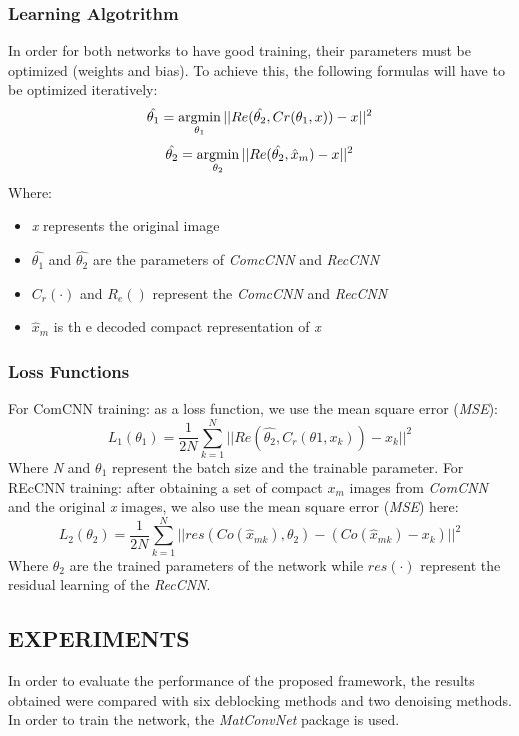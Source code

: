 \subsubsection{Learning Algotrithm}
In order for both networks to have good training, their parameters must be 
optimized (weights and bias). To achieve this, the following formulas will 
have to be optimized iteratively:
\begin{equation}
    \hat{\theta_1} = \operatorname*{argmin}\limits_{\theta_1}||Re(\hat{\theta_2},Cr(\theta_1,x))-x||^2
\end{equation}
\begin{equation}
    \hat{\theta_2} = \operatorname*{argmin}\limits_{\theta_2}||Re(\hat{\theta_2},\hat{x}_m)-x||^2
\end{equation}
Where:
\begin{itemize}
    \item \emph{x} represents the original image
    \item $ \hat{\theta_1} $ and $ \hat{\theta_2} $ are the parameters of \emph{ComcCNN} and \emph{RecCNN}
    \item $ C_r(\cdot) $ and $ R_e() $ represent the \emph{ComcCNN} and \emph{RecCNN}
    \item $ \hat{x}_m $ is th e decoded compact representation of \emph{x}
\end{itemize}

\subsubsection{Loss Functions}
For ComCNN training: as a loss function, we use the mean square error (\emph{MSE}):
\begin{equation}
    L_1(\theta_1) = \frac{1}{2N}\sum_{k=1}^N||Re(\hat{\theta_2}, C_r(\theta1,x_k))-x_k||^2
\end{equation}
Where \emph{N} and $ \theta_1 $ represent the batch size and the trainable parameter.
For REcCNN training: after obtaining a set of compact $ x_m $ images from 
\emph{ComCNN} and the original \emph{x} images, we also use the mean square error 
(\emph{MSE}) here:
\begin{equation}
    L_2(\theta_2) = \frac{1}{2N}\sum_{k=1}^N||res(Co(\hat{x}_{mk}), \theta_2) - (Co(\hat{x}_{mk})-x_k)||^2
\end{equation}
Where $ \theta_2 $ are the trained parameters of the network while $ res(\cdot) $ represent 
the residual learning of the \emph{RecCNN}.

\subsection{EXPERIMENTS}
In order to evaluate the performance of the proposed framework, the results 
obtained were compared with six deblocking methods and two denoising 
methods. In order to train the network, the \emph{MatConvNet} \cite{0799924138} package is 
used.

